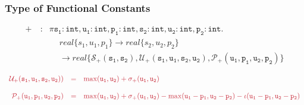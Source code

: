 \documentclass[handout,t]{beamer}
\def\real#1{real\{#1\}}
\def\Pi{\pi}
\begin{document}
\begin{frame}
  \frametitle{Type of Functional Constants}

\small
  
  $$
  \begin{array}{rcl}
\mathtt{+}~ &:& \Pi \mathtt{s_1}:\texttt{int},\mathtt{u_1}:\texttt{int}, \mathtt{p_1}:\texttt{int},\mathtt{s_2}:\texttt{int}, \mathtt{u_2}:\texttt{int}, \mathtt{p_2}:\texttt{int}.\\
&&~\quad\real{s_1,u_1,p_1}\rightarrow\real{s_2,u_2,p_2}\\
&&~\quad
\rightarrow\real{\mathcal{S}_+(\mathtt{s_1},\mathtt{s_2}),
\mathcal{U}_+(\mathtt{s_1},\mathtt{u_1},\mathtt{s_2},\mathtt{u_2}),
\mathcal{P}_+(\mathtt{u_1},\mathtt{p_1},\mathtt{u_2},\mathtt{p_2})}
\end{array}
  $$
  
\scriptsize

\vspace{0.3cm}

$$\color{red}
\begin{array}{rcl}
  \mathcal{U}_+(\mathtt{s_1},\mathtt{u_1},\mathtt{s_2},\mathtt{u_2}))&=&\max(\mathtt{u_1},\mathtt{u_2})+\sigma_+(\mathtt{u_1},\mathtt{u_2})\\
  &&\\
\mathcal{P}_+(\mathtt{u_1},\mathtt{p_1},\mathtt{u_2},\mathtt{p_2}) &=&\max(\mathtt{u_1},\mathtt{u_2})+\sigma_+(\mathtt{u_1},\mathtt{u_2})-
\max(\mathtt{u_1}-\mathtt{p_1},\mathtt{u_2}-\mathtt{p_2})-\iota(\mathtt{u_1}-\mathtt{p_1},\mathtt{u_2}-\mathtt{p_2})
\end{array}
$$


\vspace{0.1cm}


\end{frame}
\end{document}
